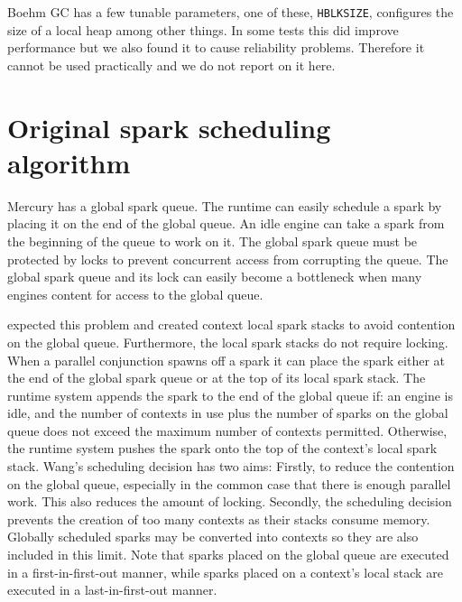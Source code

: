 Boehm GC has a few tunable parameters, one of these, \texttt{HBLKSIZE},
configures the size of a local heap among other things.
In some tests this did improve performance but we also found it to cause
reliability problems.
Therefore it cannot be used practically and we do not report on it here.


\section{Original spark scheduling algorithm}
\label{sec:old_scheduling}


Mercury has a global spark queue.
The runtime can easily schedule a spark by placing it on the end of the
global queue.
An idle engine can take a spark from the beginning of the queue to work on
it.
The global spark queue must be protected by locks to prevent concurrent
access from corrupting the queue.
The global spark queue and its lock can easily become a bottleneck when many
engines content for access to the global queue.

\citet{wang-hons} expected this problem and created context local spark stacks
to avoid contention on the global queue.
Furthermore, the local spark stacks do not require locking.
When a parallel conjunction spawns off a spark it can place the spark either
at the end of the global spark queue or at the top of its local spark stack.
The runtime system appends the spark to the end of the global queue if:
an engine is idle, and
the number of contexts in use plus the number of sparks on the global queue
does not exceed the maximum number of contexts permitted.
Otherwise,
the runtime system pushes the spark onto the top of the context's local
spark stack.
Wang's scheduling decision has two aims:
Firstly, to reduce the contention on the global queue,
especially in the common case that there is enough parallel work.
This also reduces the amount of locking.
Secondly, the scheduling decision prevents the creation of too many contexts
as their stacks consume memory.
Globally scheduled sparks may be converted into contexts so they are also
included in this limit.
Note that sparks placed on the global queue are executed in a
first-in-first-out manner, while
sparks placed on a context's local stack are executed in a
last-in-first-out manner.

